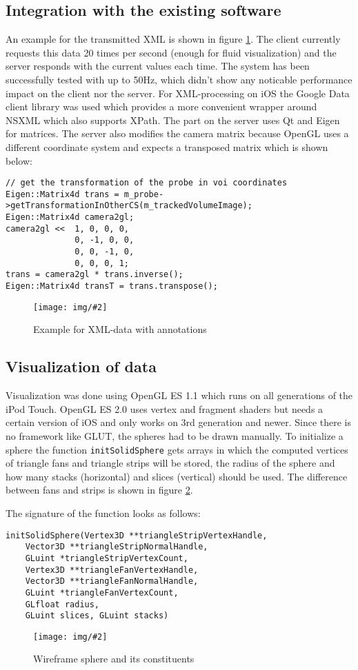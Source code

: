 \documentclass{scrartcl}
\newcommand{\graphic}[3][width=\linewidth] %
{
  \begin{figure}[h!t]
    \centering
    \texttt{[image: img/\#2]}
    \caption{#3}
    \label{fig:#2}
  \end{figure}
}
\newcommand{\refFigure}[1]{figure \ref{fig:#1}}
\begin{document}
\subsection{Integration with the existing software}
An example for the transmitted XML is shown in \refFigure{data}. The client currently requests this data 20 times per second (enough for fluid visualization) and the server responds with the current values each time. The system has been successfully tested with up to 50Hz, which didn't show any noticable performance impact on the client nor the server.
For XML-processing on iOS the Google Data client library \cite{gdata} was used which provides a more convenient wrapper around NSXML which also supports XPath.
The part on the server uses Qt \cite{qt} and Eigen \cite{eigen} for matrices. The server also modifies the camera matrix because OpenGL uses a different coordinate system and expects a transposed matrix which is shown below:
\begin{verbatim}
// get the transformation of the probe in voi coordinates
Eigen::Matrix4d trans = m_probe->getTransformationInOtherCS(m_trackedVolumeImage);				
Eigen::Matrix4d camera2gl;
camera2gl <<  1, 0, 0, 0,
              0, -1, 0, 0,
              0, 0, -1, 0,
              0, 0, 0, 1;
trans = camera2gl * trans.inverse();
Eigen::Matrix4d transT = trans.transpose();
\end{verbatim}
\graphic[scale=.5]{data}{Example for XML-data with annotations}


\subsection{Visualization of data}
Visualization was done using OpenGL ES 1.1 which runs on all generations of the iPod Touch. OpenGL ES 2.0 uses vertex and fragment shaders but needs a certain version of iOS and only works on 3rd generation and newer.
Since there is no framework like GLUT, the spheres had to be drawn manually. To initialize a sphere the function \verb|initSolidSphere| gets arrays in which the computed vertices of triangle fans and triangle strips will be stored, the radius of the sphere and how many stacks (horizontal) and slices (vertical) should be used.
The difference between fans and strips is shown in \refFigure{sphere}.

The signature of the function looks as follows:
\begin{verbatim}
initSolidSphere(Vertex3D **triangleStripVertexHandle,
    Vector3D **triangleStripNormalHandle,
    GLuint *triangleStripVertexCount,
    Vertex3D **triangleFanVertexHandle,
    Vector3D **triangleFanNormalHandle,
    GLuint *triangleFanVertexCount,
    GLfloat radius,
    GLuint slices, GLuint stacks)
\end{verbatim}
\graphic[scale=.5]{sphere}{Wireframe sphere and its constituents \cite{wikipedia}}
\end{document}

